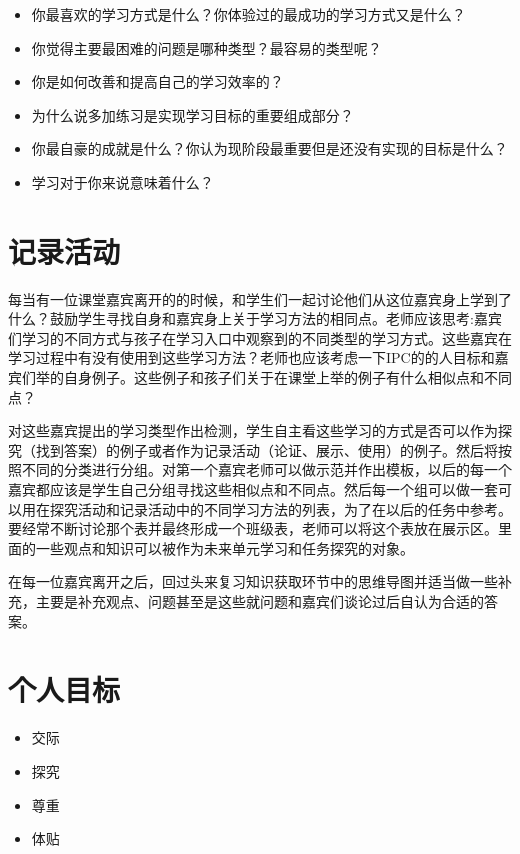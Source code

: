     \begin{itemize}
       \item  你最喜欢的学习方式是什么？你体验过的最成功的学习方式又是什么？
       \item  你觉得主要最困难的问题是哪种类型？最容易的类型呢？
       \item  你是如何改善和提高自己的学习效率的？
       \item  为什么说多加练习是实现学习目标的重要组成部分？
       \item  你最自豪的成就是什么？你认为现阶段最重要但是还没有实现的目标是什么？
       \item  学习对于你来说意味着什么？
    \end{itemize}

\section{记录活动}
     每当有一位课堂嘉宾离开的的时候，和学生们一起讨论他们从这位嘉宾身上学到了什么？鼓励学生寻找自身和嘉宾身上关于学习方法的相同点。老师应该思考:嘉宾们学习的不同方式与孩子在学习入口中观察到的不同类型的学习方式。这些嘉宾在学习过程中有没有使用到这些学习方法？老师也应该考虑一下IPC的的人目标和嘉宾们举的自身例子。这些例子和孩子们关于在课堂上举的例子有什么相似点和不同点？\par
     对这些嘉宾提出的学习类型作出检测，学生自主看这些学习的方式是否可以作为探究（找到答案）的例子或者作为记录活动（论证、展示、使用）的例子。然后将按照不同的分类进行分组。对第一个嘉宾老师可以做示范并作出模板，以后的每一个嘉宾都应该是学生自己分组寻找这些相似点和不同点。然后每一个组可以做一套可以用在探究活动和记录活动中的不同学习方法的列表，为了在以后的任务中参考。要经常不断讨论那个表并最终形成一个班级表，老师可以将这个表放在展示区。里面的一些观点和知识可以被作为未来单元学习和任务探究的对象。\par
     在每一位嘉宾离开之后，回过头来复习知识获取环节中的思维导图并适当做一些补充，主要是补充观点、问题甚至是这些就问题和嘉宾们谈论过后自认为合适的答案。\par



\section{个人目标}
     \begin{itemize}
       \item 交际
       \item 探究
       \item 尊重
       \item 体贴   
     \end{itemize}
